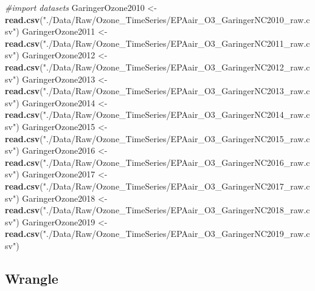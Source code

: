 \documentclass[]{article}
\newenvironment{Shaded}{\begin{snugshade}}{\end{snugshade}}
\newcommand{\CommentTok}[1]{\textcolor[rgb]{0.56,0.35,0.01}{\textit{#1}}}
\newcommand{\KeywordTok}[1]{\textcolor[rgb]{0.13,0.29,0.53}{\textbf{#1}}}
\newcommand{\NormalTok}[1]{#1}
\newcommand{\StringTok}[1]{\textcolor[rgb]{0.31,0.60,0.02}{#1}}
\begin{document}
\begin{Shaded}
\begin{Highlighting}[]
\CommentTok{#import datasets }
\NormalTok{GaringerOzone2010 <-}\StringTok{ }\KeywordTok{read.csv}\NormalTok{(}\StringTok{"./Data/Raw/Ozone_TimeSeries/EPAair_O3_GaringerNC2010_raw.csv"}\NormalTok{)}
\NormalTok{GaringerOzone2011 <-}\StringTok{ }\KeywordTok{read.csv}\NormalTok{(}\StringTok{"./Data/Raw/Ozone_TimeSeries/EPAair_O3_GaringerNC2011_raw.csv"}\NormalTok{)}
\NormalTok{GaringerOzone2012 <-}\StringTok{ }\KeywordTok{read.csv}\NormalTok{(}\StringTok{"./Data/Raw/Ozone_TimeSeries/EPAair_O3_GaringerNC2012_raw.csv"}\NormalTok{)}
\NormalTok{GaringerOzone2013 <-}\StringTok{ }\KeywordTok{read.csv}\NormalTok{(}\StringTok{"./Data/Raw/Ozone_TimeSeries/EPAair_O3_GaringerNC2013_raw.csv"}\NormalTok{)}
\NormalTok{GaringerOzone2014 <-}\StringTok{ }\KeywordTok{read.csv}\NormalTok{(}\StringTok{"./Data/Raw/Ozone_TimeSeries/EPAair_O3_GaringerNC2014_raw.csv"}\NormalTok{)}
\NormalTok{GaringerOzone2015 <-}\StringTok{ }\KeywordTok{read.csv}\NormalTok{(}\StringTok{"./Data/Raw/Ozone_TimeSeries/EPAair_O3_GaringerNC2015_raw.csv"}\NormalTok{)}
\NormalTok{GaringerOzone2016 <-}\StringTok{ }\KeywordTok{read.csv}\NormalTok{(}\StringTok{"./Data/Raw/Ozone_TimeSeries/EPAair_O3_GaringerNC2016_raw.csv"}\NormalTok{)}
\NormalTok{GaringerOzone2017 <-}\StringTok{ }\KeywordTok{read.csv}\NormalTok{(}\StringTok{"./Data/Raw/Ozone_TimeSeries/EPAair_O3_GaringerNC2017_raw.csv"}\NormalTok{)}
\NormalTok{GaringerOzone2018 <-}\StringTok{ }\KeywordTok{read.csv}\NormalTok{(}\StringTok{"./Data/Raw/Ozone_TimeSeries/EPAair_O3_GaringerNC2018_raw.csv"}\NormalTok{)}
\NormalTok{GaringerOzone2019 <-}\StringTok{ }\KeywordTok{read.csv}\NormalTok{(}\StringTok{"./Data/Raw/Ozone_TimeSeries/EPAair_O3_GaringerNC2019_raw.csv"}\NormalTok{)}
\end{Highlighting}
\end{Shaded}

\hypertarget{wrangle}{%
\subsection{Wrangle}\label{wrangle}}
\end{document}
